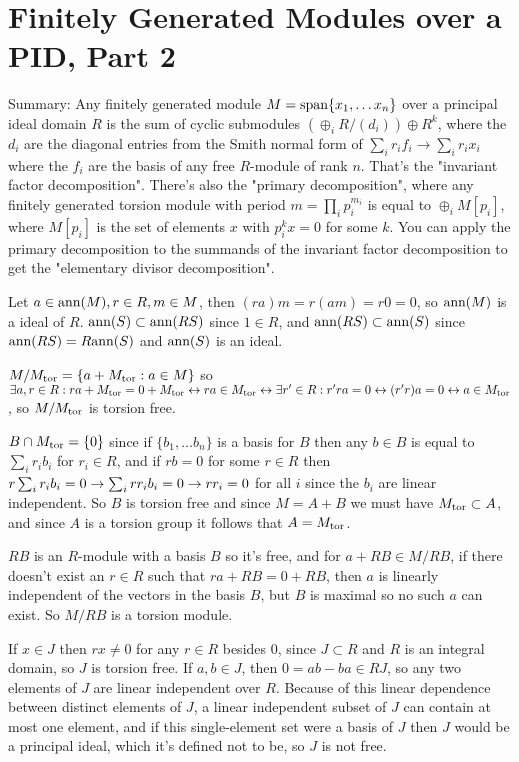 \documentclass[11pt, oneside]{article}   	%
\begin{document}
\section{Finitely Generated Modules over a PID, Part 2}
Summary: Any finitely generated module $M = \text{span}\{x_1, \ldots x_n\}$ over a principal ideal domain $R$ is the sum of cyclic submodules $(\oplus_i R/(d_i)) \oplus R^k$, where the $d_i$ are the diagonal entries from the Smith normal form of $\sum_ir_if_i \to \sum_ir_ix_i$ where the $f_i$ are the basis of any free $R$-module of rank $n$. That's the "invariant factor decomposition". There's also the "primary decomposition", where any finitely generated torsion module with period $m = \prod_ip_i^{m_i}$ is equal to $\oplus_iM[p_i]$, where $M[p_i]$ is the set of elements $x$ with $p_i^kx = 0$ for some $k$. You can apply the primary decomposition to the summands of the invariant factor decomposition to get the "elementary divisor decomposition".
\be
\item Let $a \in \text{ann}(M), r \in R, m \in M$, then $(ra)m = r(am) = r0 = 0$, so $\text{ann}(M)$ is a ideal of $R$. $\text{ann}(S) \subset \text{ann}(RS)$ since $1 \in R$, and $\text{ann}(RS) \subset \text{ann}(S)$ since $\text{ann}(RS) = R\text{ann}(S)$ and $\text{ann}(S)$ is an ideal.
\item $M / M_{\text{tor}} = \{a + M_{\text{tor}}: a \in M\}$ so $\exists a, r \in R: ra + M_{\text{tor}} = 0 + M_{\text{tor}} \leftrightarrow ra \in M_{\text{tor}} \leftrightarrow \exists r' \in R: r'ra = 0 \leftrightarrow (r'r)a = 0 \leftrightarrow a \in M_{\text{tor}}$, so $M/M_{\text{tor}}$ is torsion free.
\item $B \cap M_{\text{tor}} = \{0\}$ since if $\{b_1, \ldots b_n\}$ is a basis for $B$ then any $b \in B$ is equal to $\sum_ir_ib_i$ for $r_i \in R$, and if $rb = 0$ for some $r \in R$ then $r\sum_ir_ib_i = 0 \rightarrow \sum_irr_ib_i = 0 \rightarrow rr_i = 0$ for all $i$ since the $b_i$ are linear independent. So $B$ is torsion free and since $M = A + B$ we must have $M_{\text{tor}} \subset A$, and since $A$ is a torsion group it follows that $A = M_{\text{tor}}$.
\item $RB$ is an $R$-module with a basis $B$ so it's free, and for $a + RB \in M/RB$, if there doesn't exist an $r \in R$ such that $ra + RB = 0 + RB$, then $a$ is linearly independent of the vectors in the basis $B$, but $B$ is maximal so no such $a$ can exist. So $M/RB$ is a torsion module.
\item If $x \in J$ then $rx \not = 0$ for any $r \in R$ besides 0, since $J \subset R$ and $R$ is an integral domain, so $J$ is torsion free. If $a, b \in J$, then $0 = ab - ba \in RJ$, so any two elements of $J$ are linear independent over $R$. Because of this linear dependence between distinct elements of $J$, a linear independent subset of $J$ can contain at most one element, and if this single-element set were a basis of $J$ then $J$ would be a principal ideal, which it's defined not to be, so $J$ is not free.
\end{document}
